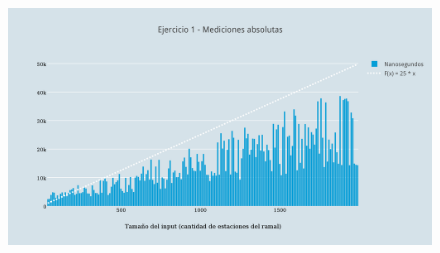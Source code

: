   \begin{figure}[h!]
   \begin{center}
 	\includegraphics[scale=0.8]{imagenes/ej1/absolutas.png}
	\label{estaciones}
   \end{center}
 \end{figure}


\newpage

